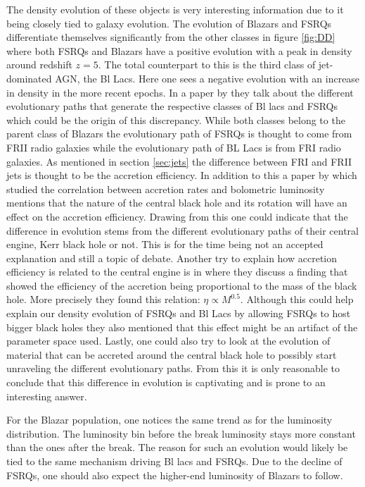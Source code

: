 The density evolution of these objects is very interesting information due to it being closely tied to galaxy evolution. The evolution of Blazars and FSRQs differentiate themselves significantly from the other classes in figure \ref*{fig:DD}
where both FSRQs and Blazars have a positive evolution with a peak in density around redshift $z=5$. The total counterpart to this is the third class of jet-dominated AGN, the Bl Lacs. Here one sees a negative evolution with 
an increase in density in the more recent epochs. In a paper by \cite{Garofalo_2019} they talk about the different evolutionary paths that generate the respective classes of Bl lacs and FSRQs which could be the origin of this discrepancy. 
While both classes belong to the parent class of Blazars the evolutionary path of FSRQs is thought to come from FRII radio galaxies while the evolutionary path of BL Lacs is from FRI radio galaxies. As mentioned in section \ref*{sec:jets} the difference between FRI and FRII jets is thought to be the accretion efficiency. 
In addition to this a paper by \cite{Wei-Hao_2003} which studied the correlation between accretion rates and bolometric luminosity mentions that the nature of the central black hole and its rotation will have an effect on the accretion efficiency. Drawing from this one could indicate that the difference in evolution stems from the different evolutionary paths of their central engine, Kerr black hole or not.  
This is for the time being not an accepted explanation and still a topic of debate. 
Another try to explain how accretion efficiency is related to the central engine is in \cite{Raimundo_2012} where they discuss a finding that showed the efficiency of the accretion being proportional to the mass of the black hole.  
More precisely they found this relation: $\eta \propto M^{0.5}$. Although this could help explain our density evolution of FSRQs and Bl Lacs by allowing FSRQs to host bigger black holes they also mentioned that this effect might be an artifact of the parameter space used. 
Lastly, one could also try to look at the evolution of material that can be accreted around the central black hole to possibly start unraveling the different evolutionary paths.
From this it is only reasonable to conclude that this difference in evolution is captivating and is prone to an interesting answer. 


For the Blazar population, one notices the same trend as for the luminosity distribution. The luminosity bin before the break luminosity stays more constant than the ones after the break. The reason for such an evolution 
would likely be tied to the same mechanism driving Bl lacs and FSRQs. Due to the decline of FSRQs, one should also expect the
higher-end luminosity of Blazars to follow.


